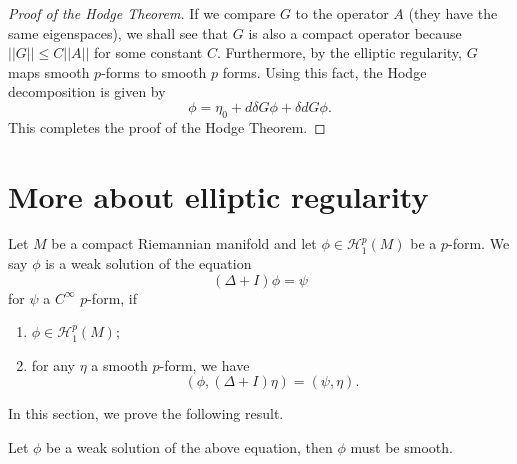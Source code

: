 \begin{proof}[Proof of the Hodge Theorem]
If we compare $G$ to the operator $A$ (they  have
the same eigenspaces), we shall see that
$G$ is also a compact  operator because $||G||\leq
C||A||$ for some constant $C$.
Furthermore, by the elliptic regularity, $G$ maps
smooth $p$-forms to smooth  $p$
forms.
Using this
fact, the Hodge decomposition is given by
\[
\phi=\eta_0+d\delta G\phi+\delta dG\phi.
\]
This completes the proof of the Hodge Theorem.

\end{proof}

\section{More about elliptic regularity}\label{Ellipticity}
Let $M$ be a compact Riemannian manifold and let $\phi\in \mathcal H^p_1(M)$ be a $p$-form. We say 
$\phi$ is a weak solution of the equation
\[
(\Delta+I)\phi=\psi
\]
for $\psi$ a $C^\infty$ $p$-form, if
\begin{enumerate}
\item $\phi\in \mathcal H^p_1(M)$;
\item for any $\eta$ a smooth $p$-form, we have
\[
(\phi,(\Delta+I)\eta)=(\psi,\eta).
\]
\end{enumerate}

In this section, we prove the following result.
\begin{theorem} Let $\phi$ be a weak solution of the above equation, then $\phi$ must be smooth.
\end{theorem}

